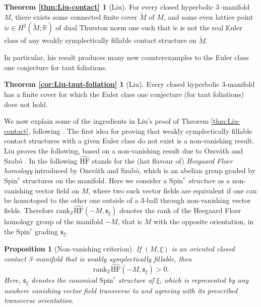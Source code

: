 \documentclass[11pt]{amsart}
\newtheorem{prop}[thm]{Proposition}
\theoremstyle{remark}
\theoremstyle{definition}
\begin{document}
	\theoremstyle{theorem}
	\newtheorem*{Liu-contact}{Theorem \ref{thm:Liu-contact}}
	\begin{Liu-contact}[Liu]
		For every closed hyperbolic 3–manifold $M$, there exists some connected finite cover $\tilde{M}$ of $M$, and some even lattice point $\tilde{w} \in H^2(\tilde{M}; \mathbb{R})$ of dual Thurston norm one such that $\tilde{w}$ is not the real Euler class of any weakly symplectically fillable contact structure on $\tilde{M}$.
	\end{Liu-contact}	
	
	In particular, his result produces many new counterexamples to the Euler class one conjecture for taut foliations.  
	
	
	\theoremstyle{theorem}
	\newtheorem*{Liu-corollary}{Theorem \ref{cor:Liu-taut-foliation}}
	\begin{Liu-corollary}[Liu]
		Every closed hyperbolic 3-manifold has a finite cover for which the Euler class one conjecture (for taut foliations) does not hold. 
	\end{Liu-corollary}	
	
	
	We now explain some of the ingredients in Liu's proof of Theorem \ref{thm:Liu-contact}, following \cite{liu2024euler}. The first idea for proving that weakly symplectically fillable contact structures with a given Euler class do not exist is a non-vanishing result. Liu \cite{liu2024euler} proves the following, based on a non-vanishing result due to Ozsv\'{a}th and Szab\'{o} \cite[Theorem 4.2]{ozsvath2004holomorphic}. In the following $\widehat{\mathrm{HF}}$ stands for the (hat flavour of) \emph{Heegaard Floer homology} introduced by Ozsv\'{a}th and Szab\'{o}, which is an abelian group graded by $\mathrm{Spin}^c$ structures on the manifold. Here we consider a \emph{$\mathrm{Spin}^c$ structure} as a non-vanishing vector field on $M$, where two such vector fields are equivalent if one can be homotoped to the other one outside of a 3-ball through non-vanishing vector fields.  Therefore $ \mathrm{rank}_\mathbb{Z} \widehat{\mathrm{HF}}(- M, \mathfrak{s}_\xi) $ denotes the rank of the Heegaard Floer homology group of the manifold $-M$, that is $M$ with the opposite orientation, in the $\mathrm{Spin}^c$ grading $\mathfrak{s}_\xi$. 
	
	\begin{prop}[Non-vanishing criterion]
		If $(M , \xi)$ is an oriented closed contact 3–manifold that is weakly symplectically fillable, then 
		\[ \mathrm{rank}_\mathbb{Z} \widehat{\mathrm{HF}}(- M, \mathfrak{s}_\xi) > 0. \]
		Here, $\mathfrak{s}_\xi$ denotes the canonical $\mathrm{Spin}^c$ structure of $\xi$, which is represented by any nowhere vanishing vector field transverse to and agreeing with its prescribed transverse orientation.
	\end{prop} 
\end{document}
